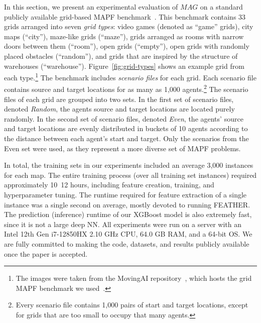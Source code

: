 \documentclass[letterpaper]{article} %
\newcommand{\Carmel}[1]{}
\newcommand{\Roni}[1]{}
\newcommand{\mapfgas}[1]{\ensuremath{\textit{MAG}}\xspace}
\begin{document}
In this section, we present an experimental evaluation of \mapfgas\ on a standard publicly available grid-based MAPF benchmark~\cite{stern2019multi}. 
This benchmark contains 33 grids arranged into seven \emph{grid types}: video
games (denoted as ``game'' grids), city maps (``city''), maze-like
grids (``maze''), grids arranged as rooms with narrow doors
between them (``room''), open grids (``empty''), open grids with
randomly placed obstacles (``random''), and grids that are inspired by the structure of warehouses (``warehouse'').
Figure~\ref{fig:grid-types} shows an example grid from each type.\footnote{The images were taken from the MovingAI repository~\cite{sturtevant2012benchmarks}, which hosts the grid MAPF benchmark we used~\cite{stern2019multi}.}
The benchmark includes \emph{scenario files} for each grid. 
Each scenario file contains source and target locations for as many as 1,000 agents.\footnote{Every scenario file contains 1,000 pairs of start and target locations, except for grids that are too small to occupy that many agents.} %
The scenario files of each grid are grouped into two sets. 
In the first set of scenario files, denoted
\emph{Random}, 
the agents source and target locations are located
purely randomly. 
In the second set of scenario files, denoted
\emph{Even}, the agents’ source and target locations are evenly distributed in buckets of 10 agents according to the distance between each agent's start and target. 
Only the scenarios from the Even set were used, as they represent a more diverse set of MAPF problems. 


In total, the training sets in our experiments included an average 3,000 instances for each map. The entire training process (over all training set instances) required approximately 10~12 hours, including feature creation, training, and hyperparameter tuning. The runtime required for feature extraction of a single instance was a single second on average, mostly devoted to running FEATHER. The prediction (inference) runtime of our XGBoost model is also extremely fast, since it is not a large deep NN. All experiments were run on a server with an Intel 12th Gen i7-12850HX 2.10 GHz CPU, 64.0 GB RAM, and a 64-bit OS. We are fully committed to making the code, datasets, and results publicly available once the paper is accepted. 
\end{document}

